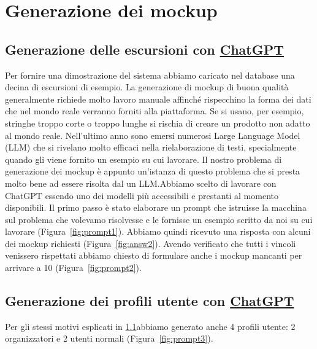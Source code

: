 \section{Generazione dei mockup}
\subsection{Generazione delle escursioni con \href{https://chat.openai.com/auth/login}{ChatGPT}}\label{sect:genEventi}
Per fornire una dimostrazione del sistema abbiamo caricato nel database una decina di escursioni di esempio.
La generazione di mockup di buona qualità generalmente richiede molto lavoro manuale affinché rispecchino la forma dei dati
che nel mondo reale verranno forniti alla piattaforma. Se si usano, per esempio, stringhe troppo corte o troppo lunghe si rischia di creare
un prodotto non adatto al mondo reale.
Nell'ultimo anno sono emersi numerosi Large Language Model (LLM) che si rivelano molto efficaci nella rielaborazione di testi, specialmente quando gli viene 
fornito un esempio su cui lavorare. Il nostro problema di generazione dei mockup è appunto un'istanza di questo problema che si presta molto bene ad essere
risolta dal un LLM\@.Abbiamo scelto di lavorare con ChatGPT essendo uno dei modelli più accessibili e prestanti al momento disponibili.
Il primo passo è stato elaborare un prompt che istruisse la macchina sul problema che volevamo risolvesse e le fornisse un esempio scritto da noi su cui lavorare (Figura~\ref*{fig:prompt1}).
Abbiamo quindi ricevuto una risposta con alcuni dei mockup richiesti (Figura~\ref*{fig:answ2}).
Avendo verificato che tutti i vincoli venissero rispettati abbiamo chiesto di formulare anche i mockup mancanti per arrivare a 10 (Figura~\ref*{fig:prompt2}).
\subsection{Generazione dei profili utente con \href{https://chat.openai.com/auth/login}{ChatGPT}}
Per gli stessi motivi esplicati in \ref*{sect:genEventi}abbiamo generato anche 4 profili utente: 2 organizzatori e 2 utenti normali (Figura~\ref*{fig:prompt3}).
\newpage
